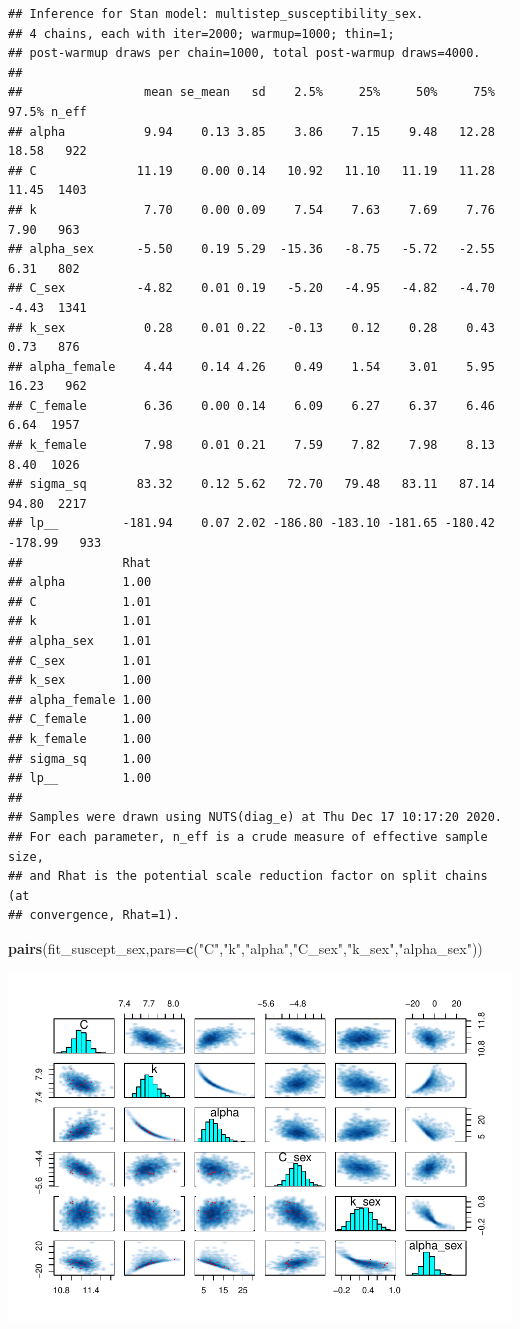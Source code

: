 \documentclass[
]{article}
\newenvironment{Shaded}{\begin{snugshade}}{\end{snugshade}}
\newcommand{\DataTypeTok}[1]{\textcolor[rgb]{0.13,0.29,0.53}{#1}}
\newcommand{\KeywordTok}[1]{\textcolor[rgb]{0.13,0.29,0.53}{\textbf{#1}}}
\newcommand{\NormalTok}[1]{#1}
\newcommand{\StringTok}[1]{\textcolor[rgb]{0.31,0.60,0.02}{#1}}
\begin{document}
\begin{verbatim}
## Inference for Stan model: multistep_susceptibility_sex.
## 4 chains, each with iter=2000; warmup=1000; thin=1; 
## post-warmup draws per chain=1000, total post-warmup draws=4000.
## 
##                 mean se_mean   sd    2.5%     25%     50%     75%   97.5% n_eff
## alpha           9.94    0.13 3.85    3.86    7.15    9.48   12.28   18.58   922
## C              11.19    0.00 0.14   10.92   11.10   11.19   11.28   11.45  1403
## k               7.70    0.00 0.09    7.54    7.63    7.69    7.76    7.90   963
## alpha_sex      -5.50    0.19 5.29  -15.36   -8.75   -5.72   -2.55    6.31   802
## C_sex          -4.82    0.01 0.19   -5.20   -4.95   -4.82   -4.70   -4.43  1341
## k_sex           0.28    0.01 0.22   -0.13    0.12    0.28    0.43    0.73   876
## alpha_female    4.44    0.14 4.26    0.49    1.54    3.01    5.95   16.23   962
## C_female        6.36    0.00 0.14    6.09    6.27    6.37    6.46    6.64  1957
## k_female        7.98    0.01 0.21    7.59    7.82    7.98    8.13    8.40  1026
## sigma_sq       83.32    0.12 5.62   72.70   79.48   83.11   87.14   94.80  2217
## lp__         -181.94    0.07 2.02 -186.80 -183.10 -181.65 -180.42 -178.99   933
##              Rhat
## alpha        1.00
## C            1.01
## k            1.01
## alpha_sex    1.01
## C_sex        1.01
## k_sex        1.00
## alpha_female 1.00
## C_female     1.00
## k_female     1.00
## sigma_sq     1.00
## lp__         1.00
## 
## Samples were drawn using NUTS(diag_e) at Thu Dec 17 10:17:20 2020.
## For each parameter, n_eff is a crude measure of effective sample size,
## and Rhat is the potential scale reduction factor on split chains (at 
## convergence, Rhat=1).
\end{verbatim}

\begin{Shaded}
\begin{Highlighting}[]
\KeywordTok{pairs}\NormalTok{(fit_suscept_sex,}\DataTypeTok{pars=}\KeywordTok{c}\NormalTok{(}\StringTok{"C"}\NormalTok{,}\StringTok{"k"}\NormalTok{,}\StringTok{"alpha"}\NormalTok{,}\StringTok{"C_sex"}\NormalTok{,}\StringTok{"k_sex"}\NormalTok{,}\StringTok{"alpha_sex"}\NormalTok{))}
\end{Highlighting}
\end{Shaded}

\includegraphics{multistep-model-comparison_files/figure-latex/model_susceptibility_sex-1.pdf}
\end{document}
